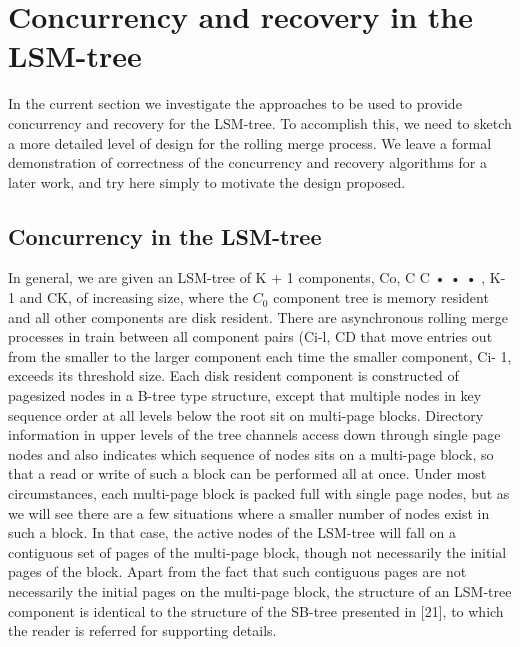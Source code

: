 \documentclass[a4paper,12pt,notitlepage,twoside,openright]{article}
\begin{document}
\hypertarget{concurrency-and-recovery-in-the-lsm-tree}{%
\section{Concurrency and recovery in the
LSM-tree}\label{concurrency-and-recovery-in-the-lsm-tree}}


In the current section we investigate the approaches to be used to
provide concurrency and recovery for the LSM-tree. To accomplish this,
we need to sketch a more detailed level of design for the rolling merge
process. We leave a formal demonstration of correctness of the
concurrency and recovery algorithms for a later work, and try here
simply to motivate the design proposed.


\hypertarget{concurrency-in-the-lsm-tree}{%
\subsection{Concurrency in the
LSM-tree}\label{concurrency-in-the-lsm-tree}}


In general, we are given an LSM-tree of K + 1 components, Co, C C • • •
, K-1 and CK, of increasing size, where the \(C_0\) component tree is memory
resident and all other components are disk resident. There are
asynchronous rolling merge processes in train between all component
pairs (Ci-l, CD that move entries out from the smaller to the larger
component each time the smaller component, Ci- 1, exceeds its threshold
size. Each disk resident component is constructed of pagesized nodes in
a B-tree type structure, except that multiple nodes in key sequence
order at all levels below the root sit on multi-page blocks. Directory
information in upper levels of the tree channels access down through
single page nodes and also indicates which sequence of nodes sits on a
multi-page block, so that a read or write of such a block can be
performed all at once. Under most circumstances, each multi-page block
is packed full with single page nodes, but as we will see there are a
few situations where a smaller number of nodes exist in such a block. In
that case, the active nodes of the LSM-tree will fall on a contiguous
set of pages of the multi-page block, though not necessarily the initial
pages of the block. Apart from the fact that such contiguous pages are
not necessarily the initial pages on the multi-page block, the structure
of an LSM-tree component is identical to the structure of the SB-tree
presented in {[}21{]}, to which the reader is referred for supporting
details.
\end{document}
